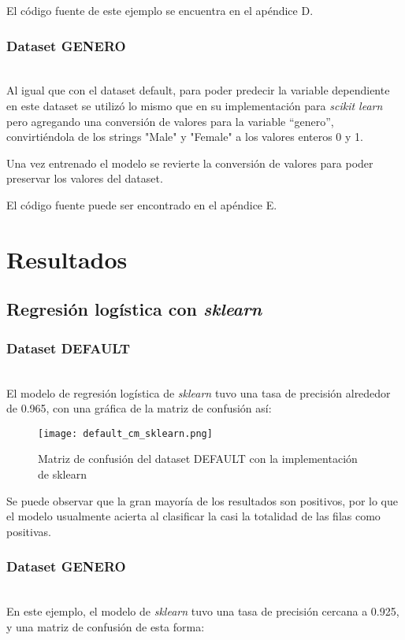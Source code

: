 \documentclass[sigconf,authorversion,nonacm]{acmart}
\begin{document}
El código fuente de este ejemplo se encuentra en el apéndice D.

\subsubsection{Dataset GENERO}\hfill\\
Al igual que con el dataset default, para poder predecir la variable dependiente en este dataset se utilizó lo mismo que en su implementación para \textit{scikit learn} pero agregando una conversión de valores para la variable “genero”, convirtiéndola de los strings "Male" y "Female" a los valores enteros 0 y 1.

Una vez entrenado el modelo se revierte la conversión de valores para poder preservar los valores del dataset.

El código fuente puede ser encontrado en el apéndice E.

\section{Resultados}

\subsection{Regresión logística con \textit{sklearn}}

\subsubsection{Dataset DEFAULT}\hfill\\
El modelo de regresión logística de \textit{sklearn} tuvo una tasa de precisión alrededor de 0.965, con una gráfica de la matriz de confusión así:

\begin{figure}[H]
  \centering
  \texttt{[image: default\_cm\_sklearn.png]}
  \caption{Matriz de confusión del dataset DEFAULT con la implementación de sklearn}
\end{figure}

Se puede observar que la gran mayoría de los resultados son positivos, por lo que el modelo usualmente acierta al clasificar la casi la totalidad de las filas como positivas.

\subsubsection{Dataset GENERO}\hfill\\
En este ejemplo, el modelo de \textit{sklearn} tuvo una tasa de precisión cercana a 0.925, y una matriz de confusión de esta forma:
\end{document}
